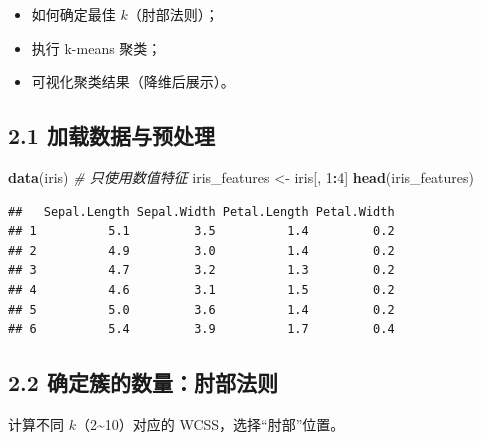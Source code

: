 \documentclass[
]{article}
\newenvironment{Shaded}{\begin{snugshade}}{\end{snugshade}}
\newcommand{\CommentTok}[1]{\textcolor[rgb]{0.56,0.35,0.01}{\textit{#1}}}
\newcommand{\DecValTok}[1]{\textcolor[rgb]{0.00,0.00,0.81}{#1}}
\newcommand{\FunctionTok}[1]{\textcolor[rgb]{0.13,0.29,0.53}{\textbf{#1}}}
\newcommand{\NormalTok}[1]{#1}
\newcommand{\OtherTok}[1]{\textcolor[rgb]{0.56,0.35,0.01}{#1}}
\newcommand{\SpecialCharTok}[1]{\textcolor[rgb]{0.81,0.36,0.00}{\textbf{#1}}}
\providecommand{\tightlist}{%
  \setlength{\itemsep}{0pt}\setlength{\parskip}{0pt}}
\begin{document}
\begin{itemize}
\tightlist
\item
  如何确定最佳 \(k\)（肘部法则）；
\item
  执行 k-means 聚类；
\item
  可视化聚类结果（降维后展示）。
\end{itemize}

\subsection{2.1
加载数据与预处理}\label{ux52a0ux8f7dux6570ux636eux4e0eux9884ux5904ux7406}

\begin{Shaded}
\begin{Highlighting}[]
\FunctionTok{data}\NormalTok{(iris)}
\CommentTok{\# 只使用数值特征}
\NormalTok{iris\_features }\OtherTok{\textless{}{-}}\NormalTok{ iris[, }\DecValTok{1}\SpecialCharTok{:}\DecValTok{4}\NormalTok{]}
\FunctionTok{head}\NormalTok{(iris\_features)}
\end{Highlighting}
\end{Shaded}

\begin{verbatim}
##   Sepal.Length Sepal.Width Petal.Length Petal.Width
## 1          5.1         3.5          1.4         0.2
## 2          4.9         3.0          1.4         0.2
## 3          4.7         3.2          1.3         0.2
## 4          4.6         3.1          1.5         0.2
## 5          5.0         3.6          1.4         0.2
## 6          5.4         3.9          1.7         0.4
\end{verbatim}

\subsection{2.2
确定簇的数量：肘部法则}\label{ux786eux5b9aux7c07ux7684ux6570ux91cfux8098ux90e8ux6cd5ux5219}

计算不同 \(k\)（2\textasciitilde10）对应的 WCSS，选择``肘部''位置。
\end{document}
